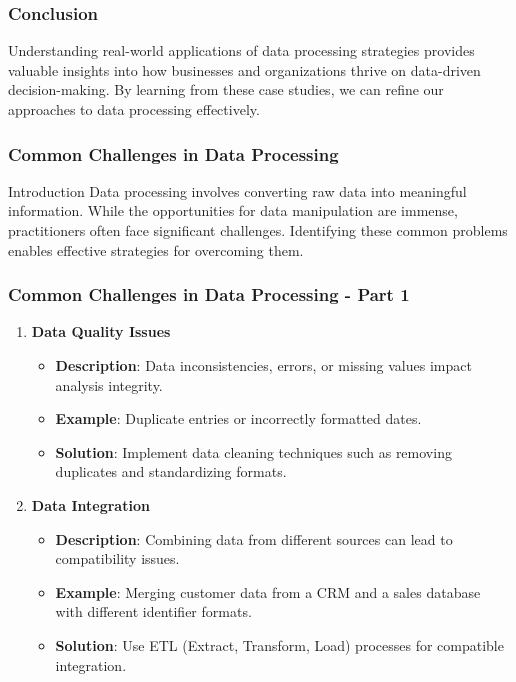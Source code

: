 \documentclass[aspectratio=169]{beamer}
\begin{document}
\begin{frame}[fragile]
    \frametitle{Conclusion}
    Understanding real-world applications of data processing strategies provides valuable insights into how businesses and organizations thrive on data-driven decision-making. By learning from these case studies, we can refine our approaches to data processing effectively.
\end{frame}

\begin{frame}[fragile]
    \frametitle{Common Challenges in Data Processing}
    \begin{block}{Introduction}
        Data processing involves converting raw data into meaningful information. 
        While the opportunities for data manipulation are immense, practitioners often face significant challenges. 
        Identifying these common problems enables effective strategies for overcoming them.
    \end{block}
\end{frame}

\begin{frame}[fragile]
    \frametitle{Common Challenges in Data Processing - Part 1}
    \begin{enumerate}
        \item \textbf{Data Quality Issues}
            \begin{itemize}
                \item \textbf{Description}: Data inconsistencies, errors, or missing values impact analysis integrity.
                \item \textbf{Example}: Duplicate entries or incorrectly formatted dates.
                \item \textbf{Solution}: Implement data cleaning techniques such as removing duplicates and standardizing formats.
            \end{itemize}

        \item \textbf{Data Integration}
            \begin{itemize}
                \item \textbf{Description}: Combining data from different sources can lead to compatibility issues.
                \item \textbf{Example}: Merging customer data from a CRM and a sales database with different identifier formats.
                \item \textbf{Solution}: Use ETL (Extract, Transform, Load) processes for compatible integration.
            \end{itemize}
    \end{enumerate}
\end{frame}
\end{document}
